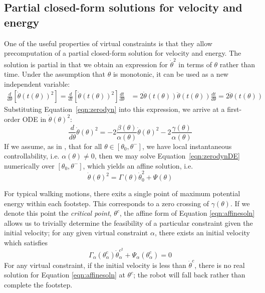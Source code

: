 \subsection{Partial closed-form solutions for velocity and energy} \label{sec:partialsol}
One of the useful properties of virtual constraints is that they allow precomputation of a partial closed-form solution for velocity and energy. The solution is partial in that we obtain an expression for $\dot{\theta}^2$ in terms of $\theta$ rather than time. Under the assumption that $\theta$ is monotonic, it can be used as a new independent variable:
\begin{align*}
	\frac{d}{d\theta}\left[\dot{\theta}\left(t(\theta)\right)^2\right] = 
	\frac{d}{dt}\left[\dot{\theta}\left(t(\theta)\right)^2\right]\frac{dt}{d\theta} &= 2\dot{\theta}(t(\theta))\ddot{\theta}(t(\theta))\frac{dt}{d\theta} = 2\ddot{\theta}\left(t(\theta)\right)
\end{align*}
Substituting Equation~\ref{eqn:zerodyn} into this expression, we arrive at a first-order ODE in $\dot{\theta}(\theta)^2$:
\begin{equation}\label{eqn:zerodynDE}
	\frac{d}{d\theta}\dot{\theta}(\theta)^2 = -2\frac{\beta(\theta)}{\alpha(\theta)}
		\dot{\theta}(\theta)^2 - 2\frac{\gamma(\theta)}{\alpha(\theta)}
\end{equation}
If we assume, as in \cite{manchester13planning}, that for all $\theta \in [\theta_0, \theta^-]$, we have local instantaneous controllability, i.e. $\alpha(\theta) \neq 0$, then we may solve Equation~\ref{eqn:zerodynDE} numerically over $[\theta_0, \theta^-]$, which yields an affine solution, i.e.
\begin{equation} \label{eqn:affinesoln}
	\dot{\theta}(\theta)^2 = \Gamma(\theta)\dot{\theta}_0^2 + \Psi(\theta)
\end{equation}

For typical walking motions, there exits a single point of maximum potential energy within each footstep. This corresponds to a zero crossing of $\gamma(\theta)$. If we denote this point the \textit{critical point}, $\theta^c$, the affine form of Equation \ref{eqn:affinesoln} allows us to trivially determine the feasibility of a particular constraint given the initial velocity; for any given virtual constraint $\alpha$, there exists an initial velocity which satisfies
\begin{equation} \label{eqn:critvel}
	\Gamma_\alpha(\theta_\alpha^c)\dot{\theta}_\alpha^{c^2} + \Psi_\alpha(\theta_\alpha^c) = 0
\end{equation}
For any virtual constraint, if the initial velocity is less than $\dot{\theta}^c$, there is no real solution for Equation \ref{eqn:affinesoln} at $\theta^c$; the robot will fall back rather than complete the footstep.

